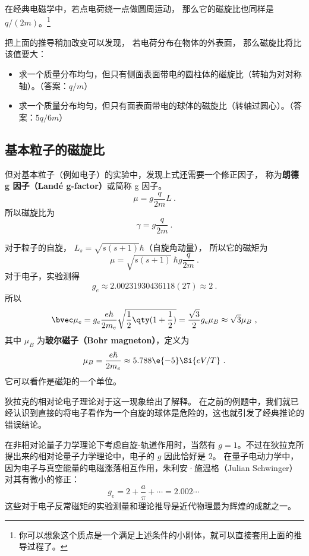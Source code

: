 在经典电磁学中，若点电荷绕一点做圆周运动， 那么它的磁旋比也同样是 $q/(2m)$。\footnote{你可以想象这个质点是一个满足上述条件的小刚体，就可以直接套用上面的推导过程了。}

把上面的推导稍加改变可以发现， 若电荷分布在物体的外表面， 那么磁旋比将比该值要大：
\begin{exercise}{}
\begin{itemize}
\item 求一个质量分布均匀，但只有侧面表面带电的圆柱体的磁旋比（转轴为对对称轴）。（答案：$q/m$）
\item 求一个质量分布均匀，但只有面表面带电的球体的磁旋比（转轴过圆心）。（答案：$5q/6m$）
\end{itemize}
\end{exercise}

\subsection{基本粒子的磁旋比}
但对基本粒子（例如电子）的实验中，发现上式还需要一个修正因子， 称为\textbf{朗德 g 因子（Landé g-factor）}或简称 g 因子。
\begin{equation}\label{eq_BohMag_4}
\mu  = g\frac{q}{2m} L~.
\end{equation}
所以磁旋比为
\begin{equation}
\gamma  = g\frac{q}{2m}~.
\end{equation}

对于粒子的自旋， $L_s = \sqrt{s(s + 1)}\hbar$（自旋角动量）， 所以它的磁矩为
\begin{equation}
\mu = \sqrt{s (s + 1)}\ \hbar g\frac{q}{2m}~.
\end{equation}
对于电子，实验测得
\begin{equation}
g_e \approx 2.00231930436118(27) \approx 2~.
\end{equation}
所以
\begin{equation}
\bvec \mu_e  = g_e \frac{e\hbar}{2 m_e} \sqrt{\frac12 \qty(1 + \frac12)}  = \frac{\sqrt 3}{2} g_e \mu_B \approx \sqrt 3 \mu_B~,
\end{equation}
其中 $\mu_B$ 为\textbf{玻尔磁子（Bohr magneton）}，定义为
\begin{equation}
\mu_B = \frac{e\hbar}{2 m_e} \approx 5.788\e{-5} \Si{eV/T}~.
\end{equation}
它可以看作是磁矩的一个单位。

狄拉克的相对论电子理论对于这一现象给出了解释。
在之前的例题中，我们就已经认识到直接的将电子看作为一个自旋的球体是危险的，这也就引发了经典推论的错误结论。

在非相对论量子力学理论下考虑自旋-轨道作用时，当然有 $g=1$。不过在狄拉克所提出来的相对论量子力学理论中，电子的 $g$ 因此恰好是 $2$。 在量子电动力学中，因为电子与真空能量的电磁涨落相互作用，朱利安·施温格（Julian Schwinger）对其有微小的修正：
\begin{equation}
g_e = 2+\frac{a}{\pi}+\cdots = 2.002\cdots~
\end{equation}
这些对于电子反常磁矩的实验测量和理论推导是近代物理最为辉煌的成就之一。
